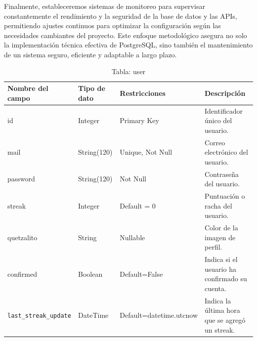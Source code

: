 Finalmente, estableceremos sistemas de monitoreo para supervisar constantemente el rendimiento y la seguridad de la base de datos y las APIs, permitiendo ajustes continuos para optimizar la configuración según las necesidades cambiantes del proyecto. Este enfoque metodológico asegura no solo la implementación técnica efectiva de PostgreSQL, sino también el mantenimiento de un sistema seguro, eficiente y adaptable a largo plazo.


\begin{table}[H]
\centering
\begin{tabularx}{\textwidth}{|l|l|l|X|}
\hline
\textbf{Nombre del campo} & \textbf{Tipo de dato} & \textbf{Restricciones} & \textbf{Descripción} \\ \hline
id                       & Integer               & Primary Key            & Identificador único del usuario. \\ \hline
mail                     & String(120)           & Unique, Not Null       & Correo electrónico del usuario. \\ \hline
password                 & String(120)           & Not Null               & Contraseña del usuario. \\ \hline
streak                   & Integer               & Default = 0            & Puntuación o racha del usuario. \\ \hline
quetzalito               & String                & Nullable               & Color de la imagen de perfil. \\ \hline
confirmed                & Boolean               & Default=False          & Indica si el usuario ha confirmado su cuenta. \\ \hline
\texttt{last\_streak\_update} & DateTime            & Default=datetime.utcnow & Indica la última hora que se agregó un streak. \\ \hline
\end{tabularx}
\caption{Tabla: user}
\end{table}

